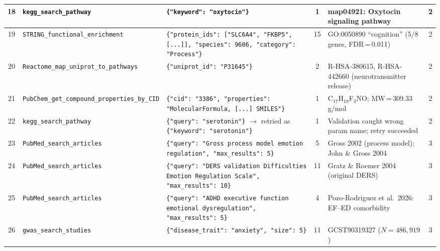 {\begin{longtable}{@{}c p{2.2cm} p{4.5cm} c p{4cm} c@{}}

18 &
\texttt{kegg\_search\_\allowbreak pathway} &
\texttt{\{"keyword": "oxytocin"\}} &
1 &
map04921: Oxytocin signaling pathway &
2 \\
\midrule

19 &
\texttt{STRING\_\allowbreak functional\_\allowbreak enrichment} &
\texttt{\{"protein\_ids": ["SLC6A4", "FKBP5", [...]], "species": 9606, "category": "Process"\}} &
15 &
GO:0050890 ``cognition'' (5/8 genes, FDR\,=\,0.011) &
2 \\
\midrule

20 &
\texttt{Reactome\_map\_\allowbreak uniprot\_to\_\allowbreak pathways} &
\texttt{\{"uniprot\_id": "P31645"\}} &
2 &
R-HSA-380615, R-HSA-442660 (neurotransmitter release) &
2 \\
\midrule

21 &
\texttt{PubChem\_get\_\allowbreak compound\_\allowbreak properties\_\allowbreak by\_CID} &
\texttt{\{"cid": "3386", "properties": "MolecularFormula, [...] SMILES"\}} &
1 &
C$_{17}$H$_{18}$F$_3$NO; MW\,=\,309.33\,g/mol &
2 \\
\midrule

22 &
\texttt{kegg\_search\_\allowbreak pathway} &
\texttt{\{"query": "serotonin"\}} $\to$ retried as \texttt{\{"keyword": "serotonin"\}} &
1 &
Validation caught wrong param name; retry succeeded &
2 \\
\midrule


23 &
\texttt{PubMed\_search\_\allowbreak articles} &
\texttt{\{"query": "Gross process model emotion regulation", "max\_results": 5\}} &
5 &
Gross 2002 (process model); John \& Gross 2004 &
3 \\
\midrule

24 &
\texttt{PubMed\_search\_\allowbreak articles} &
\texttt{\{"query": "DERS validation Difficulties Emotion Regulation Scale", "max\_results": 10\}} &
11 &
Gratz \& Roemer 2004 (original DERS) &
3 \\
\midrule

25 &
\texttt{PubMed\_search\_\allowbreak articles} &
\texttt{\{"query": "ADHD executive function emotional dysregulation", "max\_results": 5\}} &
4 &
Pozo-Rodriguez et al.\ 2026: EF--ED comorbidity &
3 \\
\midrule

26 &
\texttt{gwas\_search\_\allowbreak studies} &
\texttt{\{"disease\_trait": "anxiety", "size": 5\}} &
11 &
GCST90319327 ($N{=}486{,}919$) &
3 \\
\midrule


\end{longtable}}
